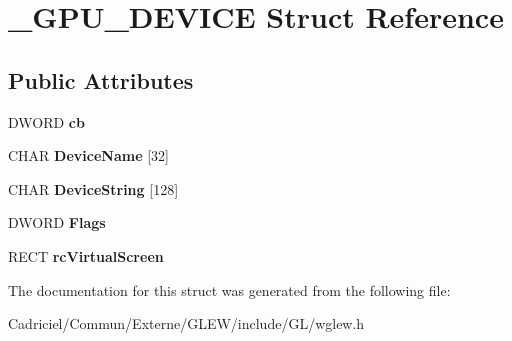 \hypertarget{struct___g_p_u___d_e_v_i_c_e}{\section{\-\_\-\-G\-P\-U\-\_\-\-D\-E\-V\-I\-C\-E Struct Reference}
\label{struct___g_p_u___d_e_v_i_c_e}
}
\subsection*{Public Attributes}
\begin{DoxyCompactItemize}
\item 
\hypertarget{struct___g_p_u___d_e_v_i_c_e_afcb22f16ba9e526610489ff56ab78ddb}{D\-W\-O\-R\-D {\bfseries cb}}\label{struct___g_p_u___d_e_v_i_c_e_afcb22f16ba9e526610489ff56ab78ddb}

\item 
\hypertarget{struct___g_p_u___d_e_v_i_c_e_a604bfab61f1a2c5d1e635837d369ba14}{C\-H\-A\-R {\bfseries Device\-Name} \mbox{[}32\mbox{]}}\label{struct___g_p_u___d_e_v_i_c_e_a604bfab61f1a2c5d1e635837d369ba14}

\item 
\hypertarget{struct___g_p_u___d_e_v_i_c_e_aff8b7920ccc85afcd6f325da6cdb0b73}{C\-H\-A\-R {\bfseries Device\-String} \mbox{[}128\mbox{]}}\label{struct___g_p_u___d_e_v_i_c_e_aff8b7920ccc85afcd6f325da6cdb0b73}

\item 
\hypertarget{struct___g_p_u___d_e_v_i_c_e_a008db9d0f5fc13a5160805f40465f14a}{D\-W\-O\-R\-D {\bfseries Flags}}\label{struct___g_p_u___d_e_v_i_c_e_a008db9d0f5fc13a5160805f40465f14a}

\item 
\hypertarget{struct___g_p_u___d_e_v_i_c_e_aeb573bbeb3b6c589246720ef259b9a27}{R\-E\-C\-T {\bfseries rc\-Virtual\-Screen}}\label{struct___g_p_u___d_e_v_i_c_e_aeb573bbeb3b6c589246720ef259b9a27}

\end{DoxyCompactItemize}


The documentation for this struct was generated from the following file\-:\begin{DoxyCompactItemize}
\item 
Cadriciel/\-Commun/\-Externe/\-G\-L\-E\-W/include/\-G\-L/wglew.\-h\end{DoxyCompactItemize}
